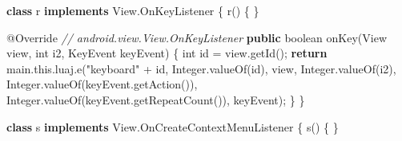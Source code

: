 \documentclass[
]{article}
\newenvironment{Shaded}{}{}
\newcommand{\AttributeTok}[1]{\textcolor[rgb]{0.49,0.56,0.16}{#1}}
\newcommand{\BuiltInTok}[1]{\textcolor[rgb]{0.00,0.50,0.00}{#1}}
\newcommand{\CommentTok}[1]{\textcolor[rgb]{0.38,0.63,0.69}{\textit{#1}}}
\newcommand{\ControlFlowTok}[1]{\textcolor[rgb]{0.00,0.44,0.13}{\textbf{#1}}}
\newcommand{\DataTypeTok}[1]{\textcolor[rgb]{0.56,0.13,0.00}{#1}}
\newcommand{\FunctionTok}[1]{\textcolor[rgb]{0.02,0.16,0.49}{#1}}
\newcommand{\KeywordTok}[1]{\textcolor[rgb]{0.00,0.44,0.13}{\textbf{#1}}}
\newcommand{\NormalTok}[1]{#1}
\newcommand{\OperatorTok}[1]{\textcolor[rgb]{0.40,0.40,0.40}{#1}}
\newcommand{\StringTok}[1]{\textcolor[rgb]{0.25,0.44,0.63}{#1}}
\begin{document}
\begin{Shaded}
\begin{Highlighting}[]
    \KeywordTok{class}\NormalTok{ r }\KeywordTok{implements} \BuiltInTok{View}\OperatorTok{.}\FunctionTok{OnKeyListener} \OperatorTok{\{}
        \FunctionTok{r}\OperatorTok{()} \OperatorTok{\{}
        \OperatorTok{\}}

        \AttributeTok{@Override} \CommentTok{// android.view.View.OnKeyListener}
        \KeywordTok{public} \DataTypeTok{boolean} \FunctionTok{onKey}\OperatorTok{(}\BuiltInTok{View}\NormalTok{ view}\OperatorTok{,} \DataTypeTok{int}\NormalTok{ i2}\OperatorTok{,} \BuiltInTok{KeyEvent}\NormalTok{ keyEvent}\OperatorTok{)} \OperatorTok{\{}
            \DataTypeTok{int}\NormalTok{ id }\OperatorTok{=}\NormalTok{ view}\OperatorTok{.}\FunctionTok{getId}\OperatorTok{();}
            \ControlFlowTok{return}\NormalTok{ main}\OperatorTok{.}\FunctionTok{this}\OperatorTok{.}\FunctionTok{luaj}\OperatorTok{.}\FunctionTok{e}\OperatorTok{(}\StringTok{"keyboard"} \OperatorTok{+}\NormalTok{ id}\OperatorTok{,} \BuiltInTok{Integer}\OperatorTok{.}\FunctionTok{valueOf}\OperatorTok{(}\NormalTok{id}\OperatorTok{),}\NormalTok{ view}\OperatorTok{,} \BuiltInTok{Integer}\OperatorTok{.}\FunctionTok{valueOf}\OperatorTok{(}\NormalTok{i2}\OperatorTok{),} \BuiltInTok{Integer}\OperatorTok{.}\FunctionTok{valueOf}\OperatorTok{(}\NormalTok{keyEvent}\OperatorTok{.}\FunctionTok{getAction}\OperatorTok{()),} \BuiltInTok{Integer}\OperatorTok{.}\FunctionTok{valueOf}\OperatorTok{(}\NormalTok{keyEvent}\OperatorTok{.}\FunctionTok{getRepeatCount}\OperatorTok{()),}\NormalTok{ keyEvent}\OperatorTok{);}
        \OperatorTok{\}}
    \OperatorTok{\}}

    \KeywordTok{class}\NormalTok{ s }\KeywordTok{implements} \BuiltInTok{View}\OperatorTok{.}\FunctionTok{OnCreateContextMenuListener} \OperatorTok{\{}
        \FunctionTok{s}\OperatorTok{()} \OperatorTok{\{}
        \OperatorTok{\}}


\end{Highlighting}
\end{Shaded}
\end{document}
